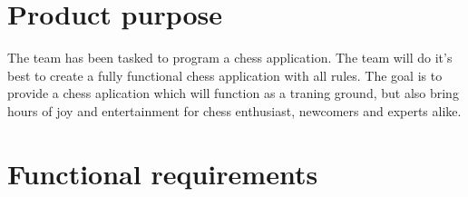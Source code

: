 \documentclass[letterpaper,11pt]{article}
\begin{document}
\maketitle
\section*{Product purpose}
The team has been tasked to program a chess application. The team will do it's best to create a fully functional chess application with all rules. The goal is to provide a chess aplication which will function as a traning ground, but also bring hours of joy and entertainment for chess enthusiast, newcomers and experts alike.
\section*{Functional requirements}
\end{document}
